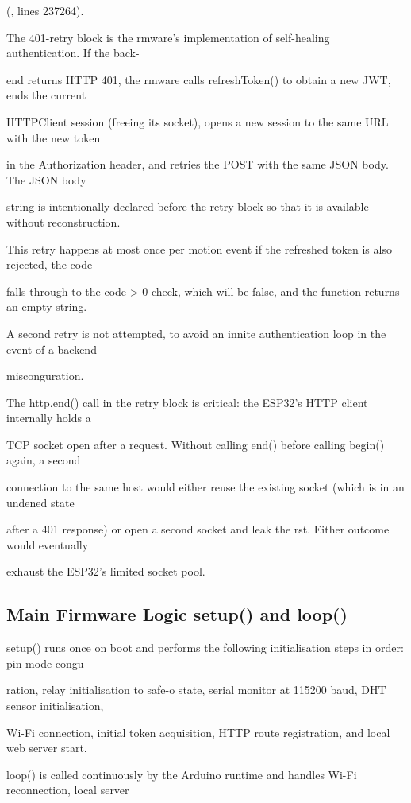 (, lines 237264).

The 401-retry block is the rmware's implementation of self-healing authentication. If the back-

end returns HTTP 401, the rmware calls refreshToken() to obtain a new JWT, ends the current

HTTPClient session (freeing its socket), opens a new session to the same URL with the new token

in the Authorization header, and retries the POST with the same JSON body. The JSON body

string is intentionally declared before the retry block so that it is available without reconstruction.

This retry happens at most once per motion event  if the refreshed token is also rejected, the code

falls through to the code > 0 check, which will be false, and the function returns an empty string.

A second retry is not attempted, to avoid an innite authentication loop in the event of a backend

misconguration.

The http.end() call in the retry block is critical: the ESP32's HTTP client internally holds a

TCP socket open after a request. Without calling end() before calling begin() again, a second

connection to the same host would either reuse the existing socket (which is in an undened state

after a 401 response) or open a second socket and leak the rst. Either outcome would eventually

exhaust the ESP32's limited socket pool.


\subsection{Main Firmware Logic  setup() and loop()}
setup() runs once on boot and performs the following initialisation steps in order: pin mode congu-

ration, relay initialisation to safe-o state, serial monitor at 115200 baud, DHT sensor initialisation,

Wi-Fi connection, initial token acquisition, HTTP route registration, and local web server start.

loop() is called continuously by the Arduino runtime and handles Wi-Fi reconnection, local server

